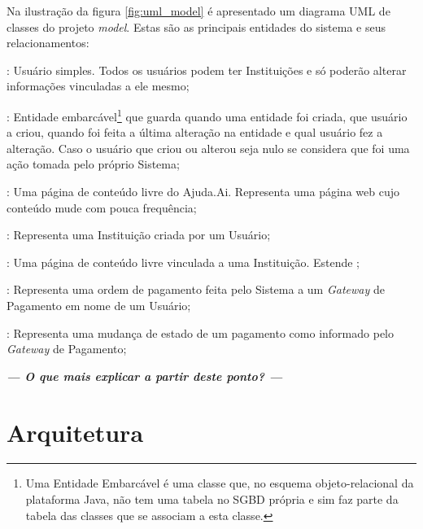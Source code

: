 Na ilustração da figura \ref{fig:uml_model} é apresentado um diagrama UML de classes do projeto \emph{model}. Estas são as principais entidades do sistema e seus relacionamentos:

\begin{lista}
\item {}: Usuário simples. Todos os usuários podem ter Instituições e só poderão alterar informações vinculadas a ele mesmo;

\item {}: Entidade embarcável\footnote{Uma Entidade Embarcável é uma classe que, no esquema objeto-relacional da plataforma Java, não tem uma tabela no SGBD própria e sim faz parte da tabela das classes que se associam a esta classe.} que guarda quando uma entidade foi criada, que usuário a criou, quando foi feita a última alteração na entidade e qual usuário fez a alteração. Caso o usuário que criou ou alterou seja nulo se considera que foi uma ação tomada pelo próprio Sistema;
\item {}: Uma página de conteúdo livre do Ajuda.Ai. Representa uma página web cujo conteúdo mude com pouca frequência;

\item {}: Representa uma Instituição criada por um Usuário;
\item {}: Uma página de conteúdo livre vinculada a uma Instituição. Estende ;

\item {}: Representa uma ordem de pagamento feita pelo Sistema a um \emph{Gateway} de Pagamento em nome de um Usuário;
\item {}: Representa uma mudança de estado de um pagamento como informado pelo \emph{Gateway} de Pagamento;
\end{lista}

\textbf{\textit{--- O que mais explicar a partir deste ponto? ---}}







\section{Arquitetura} \label{sec:ajudaai:arquitetura}

